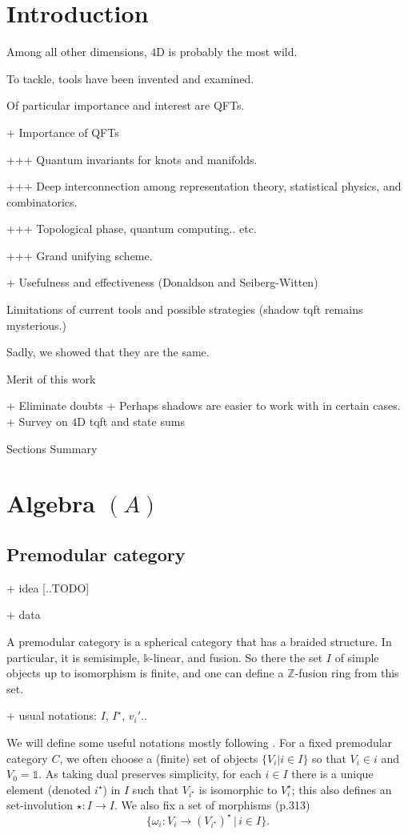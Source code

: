 \section{Introduction}

Among all other dimensions, $4$D is probably the most wild.

To tackle, tools have been invented and examined.

Of particular importance and interest are QFTs.

+ Importance of QFTs

+++ Quantum invariants for knots and manifolds.

+++ Deep interconnection among representation theory, statistical
physics, and combinatorics.

+++ Topological phase, quantum computing.. etc.

+++ Grand unifying scheme.

+ Usefulness and effectiveness (Donaldson and Seiberg-Witten)

Limitations of current tools and possible strategies (shadow tqft
remains mysterious.)

Sadly, we showed that they are the same.

Merit of this work

+ Eliminate doubts
+ Perhaps shadows are easier to work with in certain cases.
+ Survey on $4$D tqft and state sums

Sections Summary

\section{Algebra $(A)$}
\subsection{Premodular category}
+ idea [..TODO]

+ data

A premodular category is a spherical category that has a braided
structure. In particular, it is semisimple, $\mathbb{k}$-linear,
and fusion. So there the set $I$ of simple objects up to
isomorphism is finite, and one can define a $\mathbb{Z}$-fusion
ring from this set.

+ usual notations: $I$, $I^{\star}$, $v_{i}'$..

We will define some useful notations mostly following
\cite{turaev-qiok-3-manifolds}. For a fixed premodular category
$C$, we often choose a (finite) set of objects
$\{V_{i} | i \in I\}$ so that $V_{i} \in i$ and
$V_{0} = \mathbb{1}$. As taking dual preserves simplicity, for
each $i \in I$ there is a unique element (denoted $i^{\star}$) in
$I$ such that $V_{i^{\star}}$ is isomorphic to $V_{i}^{\star}$;
this also defines an set-involution $\star: I \to I$. We also fix
a set of morphisms (p.313)
$$\{\omega_{i}: V_{i} \to (V_{i^{\star}})^{\star} \,|\, i \in I\}.$$

